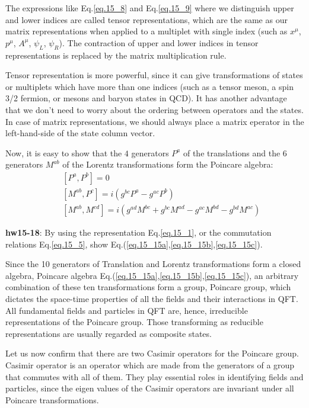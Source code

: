\documentclass[12pt]{article}
\begin{document}
{  The expressions like Eq.\ref{eq.15_8} and Eq.\ref{eq.15_9} where we distinguish upper and lower indices are called tensor representations, which are the same as our matrix representations when applied to a multiplet with single index (such as $x^\mu$, $p^\mu$, $A^\mu$, $\psi_L$, $\psi_R$).  The contraction of upper and lower indices in tensor representations is replaced by the matrix multiplication rule.

  Tensor representation is more powerful, since it can give
  transformations of states or multiplets which have more than one
  indices (such as a tensor meson, a spin 3/2 fermion, or mesons and
  baryon states in QCD).  It has another advantage that we don't need
  to worry about the ordering between operators and the states.  In case
  of matrix representations, we should always place a matrix eperator
  in the left-hand-side of the state column vector.

  Now, it is easy to show that the $4$ generators $P^a$ of the translations
  and the $6$ generators $M^{ab}$ of the Lorentz transformations form the
  Poincare algebra:
\begin{eqnarray}
  &&[ P^a, P^b ]   = 0 \label{eq.15_15a}\\
  &&[ M^{ab}, P^c ]  = i( g^{bc} P^a - g^{ac} P^b  )\label{eq.15_15b}\\
  &&[ M^{ab}, M^{cd} ] = i( g^{ad} M^{bc} +g^{bc} M^{ad} -g^{ac} M^{bd} -g^{bd} M^{ac} )\label{eq.15_15c}
\end{eqnarray}
 
{\bf hw15-18}: By using the representation Eq.\ref{eq.15_1}, or the commutation relations Eq.\ref{eq.15_5}, show Eq.(\ref{eq.15_15a},\ref{eq.15_15b},\ref{eq.15_15c}).

  Since the 10 generators of Translation and Lorentz transformations form
  a closed algebra, Poincare algebra Eq.(\ref{eq.15_15a},\ref{eq.15_15b},\ref{eq.15_15c}), an arbitrary combination of these ten transformations form a group, Poincare group, which dictates the space-time properties of all the fields and their interactions in QFT.  All fundamental fields and particles in QFT are, hence, irreducible representations of the Poincare group.  Those transforming as reducible representations are usually regarded as composite states.

  Let us now confirm that there are two Casimir operators for the
  Poincare group.  Casimir operator is an operator which are made from the
  generators of a group that commutes with all of them.  They play
  essential roles in identifying fields and particles, since the eigen
  values of the Casimir operators are invariant under all Poincare
  transformations.

}
\end{document}
